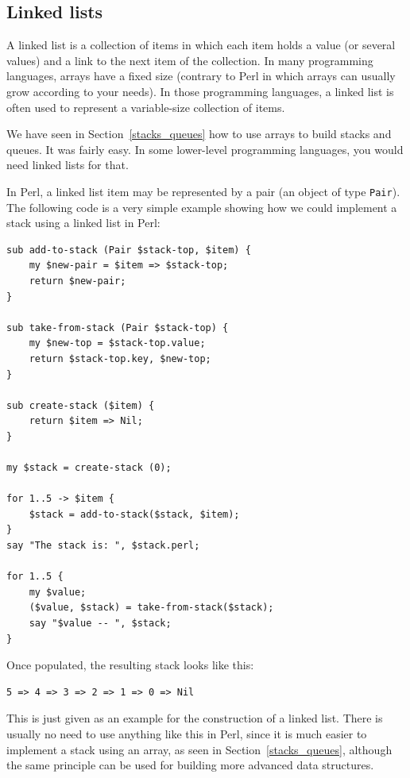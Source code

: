 \subsection{Linked lists}
\label{linked_list}

A linked list is a collection of items in which each item holds 
a value (or several values) and a link to the next item of the 
collection. In many programming languages, arrays have a fixed 
size (contrary to Perl in which arrays can usually grow according to 
your needs). In those programming languages, a linked list 
is often used to represent a variable-size collection of items.

We have seen in Section~\ref{stacks_queues} how to use arrays 
to build stacks and queues. It was fairly easy. In some 
lower-level programming languages, you would need linked 
lists for that.

In Perl, a linked list item may be represented by a pair 
(an object of type \verb'Pair'). The 
following code is a very simple example showing how 
we could implement a stack using a linked list in Perl:

\begin{verbatim}
sub add-to-stack (Pair $stack-top, $item) {
    my $new-pair = $item => $stack-top;
    return $new-pair;
}

sub take-from-stack (Pair $stack-top) {
    my $new-top = $stack-top.value;
    return $stack-top.key, $new-top;
}

sub create-stack ($item) {
    return $item => Nil;
}

my $stack = create-stack (0);

for 1..5 -> $item {
    $stack = add-to-stack($stack, $item);
}
say "The stack is: ", $stack.perl;

for 1..5 {
    my $value;
    ($value, $stack) = take-from-stack($stack);
    say "$value -- ", $stack;    
}
\end{verbatim}

Once populated, the resulting stack looks like this:

\begin{verbatim}
5 => 4 => 3 => 2 => 1 => 0 => Nil
\end{verbatim}

This is just given as an example for the construction of a 
linked list. There is usually no need to use anything like 
this in Perl, since it is much easier to implement 
a stack using an array, as seen in Section~\ref{stacks_queues}, 
although the same principle can be used for building more 
advanced data structures.


